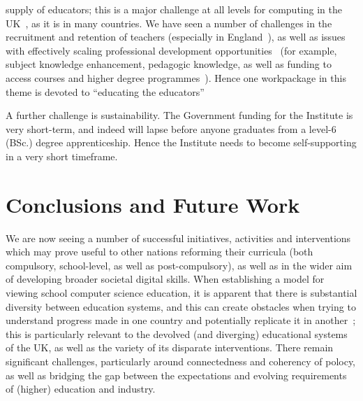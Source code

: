\documentclass[sigconf,anonymous]{acmart}
\begin{document}
\begin{enumerate}
supply of educators; this is a major challenge at all levels for
computing in the UK~\cite{brown-et-al:toce2014}, as it is in many countries. We have seen a number
of challenges in the recruitment and retention of teachers (especially
in England~\cite{sentance+waite:2018}), as well as issues with effectively scaling professional
development opportunities~\cite{sentance+csizmadia:2017} (for example, subject knowledge enhancement,
pedagogic knowledge, as well as funding to access courses and higher
degree programmes~\cite{sentance-et-al-wipsce2012}).
Hence one workpackage in this theme is devoted to ``educating the educators''
\par
A further challenge is sustainability. The Government funding for the Institute is very short-term, and indeed will lapse before anyone graduates from a level-6 (BSc.)  degree apprenticeship. Hence the Institute needs to become self-supporting in a very short timeframe.
\end{enumerate}




\section{Conclusions and Future Work}

We are now seeing a number of successful initiatives, activities and
interventions which may prove useful to other nations reforming their
curricula (both compulsory, school-level, as well as post-compulsory),
as well as in the wider aim of developing broader societal digital
skills. When establishing a model for viewing school computer science
education, it is apparent that there is substantial diversity between
education systems, and this can create obstacles when trying to
understand progress made in one country and potentially replicate it
in another~\cite{hubwieser:2013}; this is particularly relevant to the
devolved (and diverging) educational systems of the UK, as well as the
variety of its disparate interventions. There remain significant
challenges, particularly around connectedness and coherency of polocy,
as well as bridging the gap between the expectations and evolving
requirements of (higher) education and industry.
\end{document}
